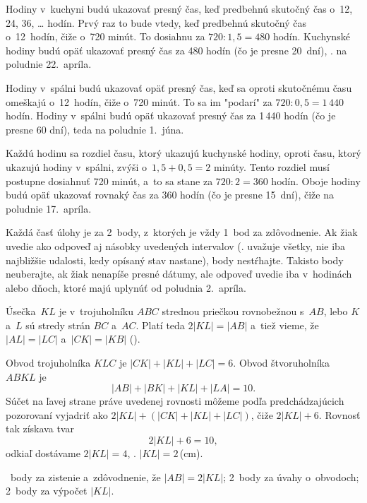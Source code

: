 {%
Hodiny v~kuchyni budú ukazovať presný čas, keď predbehnú skutočný čas
o~12, 24, 36, \dots{} hodín.
Prvý raz to bude vtedy, keď predbehnú skutočný čas o~12~hodín, čiže o~720 minút.
To dosiahnu za $720 : 1{,}5 = 480$ hodín.
Kuchynské hodiny budú opäť ukazovať presný čas za 480 hodín (čo
je presne 20~dní), \tj. na poludnie 22.~apríla.

\smallskip
Hodiny v~spálni budú ukazovať opäť presný čas, keď sa oproti skutočnému
času omeškajú o~12~hodín, čiže o~720 minút.
To sa im "podarí" za $720 : 0{,}5 = 1\,440$ hodín.
Hodiny v~spálni budú opäť ukazovať presný čas za 1\,440 hodín
(čo je presne 60 dní), teda na poludnie 1.~júna.

\smallskip
Každú hodinu sa rozdiel času, ktorý ukazujú kuchynské hodiny, oproti času,
ktorý ukazujú hodiny v~spálni, zvýši o~$1{,}5 + 0{,}5 = 2$ minúty.
Tento rozdiel musí postupne dosiahnuť 720 minút, a~to sa stane za $720 : 2 =
360$ hodín.
Oboje hodiny budú opäť ukazovať rovnaký čas za 360 hodín (čo je presne 15~dní), čiže na poludnie 17.~apríla.

\hodnotenie
Každá časť úlohy je za 2~body, z~ktorých je vždy 1~bod za zdôvodnenie. Ak žiak uvedie ako odpoveď aj násobky uvedených intervalov (\tj. uvažuje všetky, nie iba najbližšie udalosti, kedy opísaný stav nastane), body nestŕhajte. Takisto body neuberajte, ak žiak nenapíše presné dátumy, ale odpoveď uvedie iba v~hodinách alebo dňoch, ktoré majú uplynúť od poludnia 2.~apríla.
\endhodnotenie
}

{%
Úsečka~$KL$ je v~trojuholníku $ABC$ strednou priečkou rovnobežnou s~$AB$, lebo
$K$ a~$L$ sú stredy strán $BC$ a~$AC$.
Platí teda $2|KL|=|AB|$ a~tiež vieme, že $|AL|=|LC|$ a~$|CK|=|KB|$ (\obr).
%

Obvod trojuholníka $KLC$ je $|CK|+|KL|+|LC|=6$.
Obvod štvoruholníka $ABKL$ je
$$
  |AB|+|BK|+|KL|+|LA|=10.
$$
Súčet na ľavej strane práve uvedenej rovnosti môžeme podľa
predchádzajúcich pozorovaní vyjadriť ako $2|KL|+(|CK|+|KL|+|LC|)$, čiže
$2|KL|+6$.
Rovnosť tak získava tvar
$$
  2|KL|+6=10,
$$
odkiaľ dostávame $2|KL|=4$, \tj. $|KL|=2$\,(cm).

~body za zistenie a~zdôvodnenie, že $|AB|=2|KL|$;
2~body za úvahy o~obvodoch;
2~body za výpočet $|KL|$.
\endhodnotenie
}

